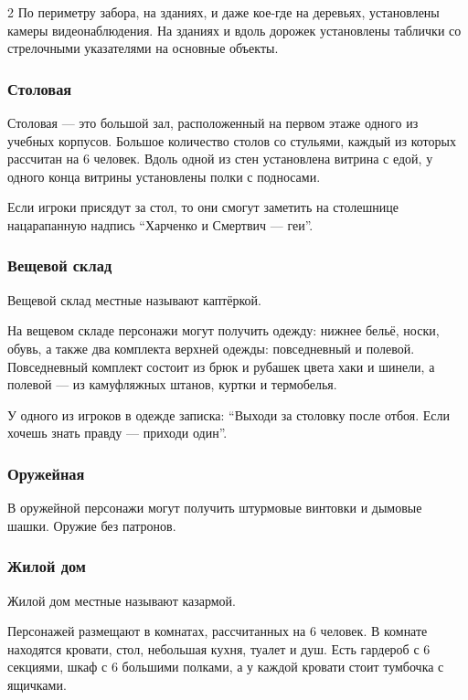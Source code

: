 \documentclass[twoside]{article}
\begin{document}
\begin{multicols}{2}
По периметру забора, на зданиях, и даже кое-где на деревьях, установлены
камеры видеонаблюдения. На зданиях и вдоль дорожек установлены таблички
со стрелочными указателями на основные объекты.

\subsubsection{Столовая}\label{mess-hall}

Столовая --- это большой зал, расположенный на первом этаже одного из
учебных корпусов. Большое количество столов со стульями, каждый из
которых рассчитан на 6 человек. Вдоль одной из стен установлена витрина
с едой, у одного конца витрины установлены полки с подносами.

Если игроки присядут за стол, то они смогут заметить на столешнице
нацарапанную надпись \enquote{Харченко и Смертвич --- геи}.

\subsubsection{\texorpdfstring{Вещевой склад}{Вещевой склад }}\label{supply-warehouse}

Вещевой склад местные называют каптёркой.

На вещевом складе персонажи могут получить одежду: нижнее бельё, носки,
обувь, а также два комплекта верхней одежды: повседневный и полевой.
Повседневный комплект состоит из брюк и рубашек цвета хаки и шинели, а
полевой --- из камуфляжных штанов, куртки и термобелья.

У одного из игроков в одежде записка: \enquote{Выходи за столовку после отбоя.
Если хочешь знать правду --- приходи один}.

\subsubsection{Оружейная}\label{armory}

В оружейной персонажи могут получить штурмовые винтовки и дымовые шашки.
Оружие без патронов.

\subsubsection{Жилой дом}\label{barracks}

Жилой дом местные называют казармой.

Персонажей размещают в комнатах, рассчитанных на 6 человек. В комнате
находятся кровати, стол, небольшая кухня, туалет и душ. Есть гардероб с
6 секциями, шкаф с 6 большими полками, а у каждой кровати стоит тумбочка
с ящичками.


\end{multicols}
\end{document}
